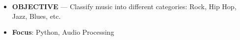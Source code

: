 
\begin{itemize}
	\item \textbf{OBJECTIVE} --- Classify music into different categories: Rock, Hip Hop, Jazz, Blues, etc.
	\item \textbf{Focus}: Python, Audio Processing
\end{itemize}





